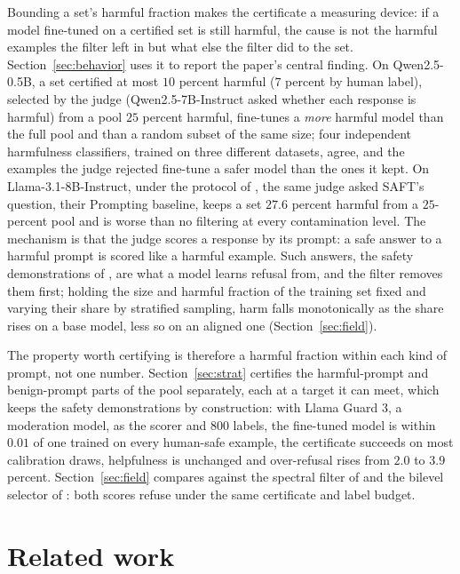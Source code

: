 \documentclass{article} %
\begin{document}
Bounding a set's harmful fraction makes the certificate a measuring device: if a model fine-tuned on a certified set is still harmful, the cause is not the harmful examples the filter left in but what else the filter did to the set. Section~\ref{sec:behavior} uses it to report the paper's central finding. On Qwen2.5-0.5B, a set certified at most $10$ percent harmful ($7$ percent by human label), selected by the judge (Qwen2.5-7B-Instruct asked whether each response is harmful) from a pool $25$ percent harmful, fine-tunes a \emph{more} harmful model than the full pool and than a random subset of the same size; four independent harmfulness classifiers, trained on three different datasets, agree, and the examples the judge rejected fine-tune a safer model than the ones it kept. On Llama-3.1-8B-Instruct, under the protocol of \citet{choi2024saft}, the same judge asked SAFT's question, their Prompting baseline, keeps a set $27.6$ percent harmful from a $25$-percent pool and is worse than no filtering at every contamination level. The mechanism is that the judge scores a response by its prompt: a safe answer to a harmful prompt is scored like a harmful example. Such answers, the safety demonstrations of \citet{bianchi2024safetytuned}, are what a model learns refusal from, and the filter removes them first; holding the size and harmful fraction of the training set fixed and varying their share by stratified sampling, harm falls monotonically as the share rises on a base model, less so on an aligned one (Section~\ref{sec:field}).

The property worth certifying is therefore a harmful fraction within each kind of prompt, not one number. Section~\ref{sec:strat} certifies the harmful-prompt and benign-prompt parts of the pool separately, each at a target it can meet, which keeps the safety demonstrations by construction: with Llama Guard 3, a moderation model, as the scorer and $800$ labels, the fine-tuned model is within $0.01$ of one trained on every human-safe example, the certificate succeeds on most calibration draws, helpfulness is unchanged and over-refusal rises from $2.0$ to $3.9$ percent. Section~\ref{sec:field} compares against the spectral filter of \citet{choi2024saft} and the bilevel selector of \citet{shen2025seal}: both scores refuse under the same certificate and label budget.

\section{Related work}
\label{sec:related}
\end{document}

